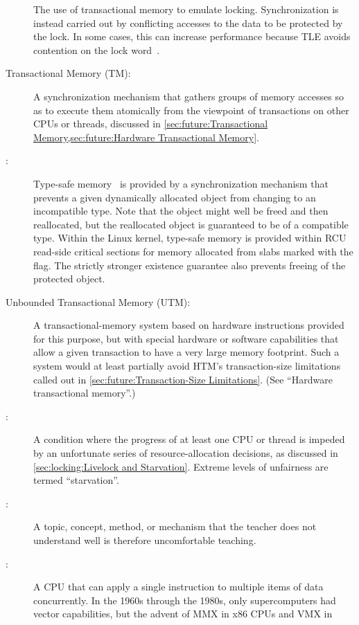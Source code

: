 \begin{description}
	The use of transactional memory to emulate locking.
	Synchronization is instead carried out by conflicting accesses
	to the data to be protected by the lock.
	In some cases, this can increase performance because TLE
	avoids contention on the lock
	word~\cite{MartinPohlack2011HTM2TLE,Kleen:2014:SEL:2566590.2576793,PascalFelber2016rwlockElision,SeongJaePark2020HTMRCUlock}.
\item[Transactional Memory (TM):]
	A synchronization mechanism that gathers groups of memory
	accesses so as to execute them atomically from the viewpoint
	of transactions on other CPUs or threads, discussed in
	\cref{sec:future:Transactional Memory,sec:future:Hardware Transactional Memory}.
\item[\IXG{Type-Safe Memory}:]
	Type-safe memory~\cite{Cheriton96a} is provided by a
	synchronization mechanism that prevents a given dynamically
	allocated object from changing to an incompatible type.
	Note that the object might well be freed and then reallocated, but
	the reallocated object is guaranteed to be of a compatible type.
	Within the Linux kernel, type-safe memory is provided within
	RCU read-side critical sections for memory allocated from slabs
	marked with the  flag.
	The strictly stronger existence guarantee also prevents freeing
	of the protected object.
\item[Unbounded Transactional Memory (UTM):]
	A transactional-memory system based on hardware instructions
	provided for this purpose, but with special hardware or
	software capabilities that allow a given transaction to
	have a very large memory footprint.
	Such a system would at least partially avoid
	HTM's transaction-size limitations called out in
	\cref{sec:future:Transaction-Size Limitations}.
	(See ``Hardware transactional memory''.)
\item[\IXG{Unfairness}:]
	A condition where the progress of at least one CPU or thread
	is impeded by an unfortunate series of resource-allocation
	decisions, as discussed in
	\cref{sec:locking:Livelock and Starvation}.
	Extreme levels of unfairness are termed ``starvation''.
\item[\IXG{Unteachable}:]
	A topic, concept, method, or mechanism that the teacher does
	not understand well is therefore uncomfortable teaching.
\item[\IXGr{Vector CPU}:]
	A CPU that can apply a single instruction to multiple items of
	data concurrently.
	In the 1960s through the 1980s, only supercomputers had vector
	capabilities, but the advent of MMX in x86 CPUs and VMX in

\end{description}
